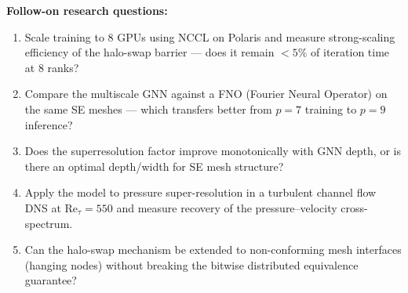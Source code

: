 \noindent\textbf{Follow-on research questions:}
\begin{enumerate}[leftmargin=1.6em,itemsep=0.2em,topsep=0.2em,label=Q\arabic*.]
\item Scale training to 8 GPUs using NCCL on Polaris and measure strong-scaling efficiency of the halo-swap barrier --- does it remain $<5\%$ of iteration time at 8 ranks?
\item Compare the multiscale GNN against a FNO (Fourier Neural Operator) on the same SE meshes --- which transfers better from $p=7$ training to $p=9$ inference?
\item Does the superresolution factor improve monotonically with GNN depth, or is there an optimal depth/width for SE mesh structure?
\item Apply the model to pressure super-resolution in a turbulent channel flow DNS at $\mathrm{Re}_\tau=550$ and measure recovery of the pressure--velocity cross-spectrum.
\item Can the halo-swap mechanism be extended to non-conforming mesh interfaces (hanging nodes) without breaking the bitwise distributed equivalence guarantee?
\end{enumerate}

